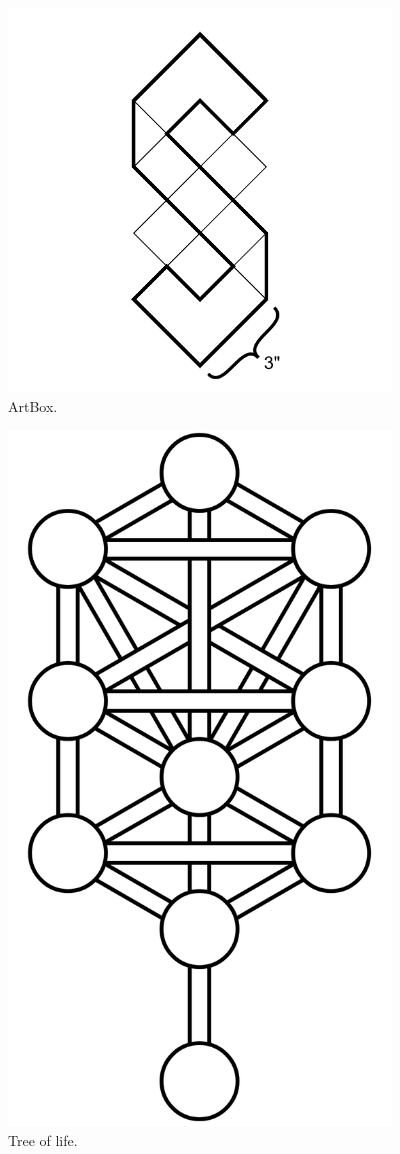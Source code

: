 \begin{figure}
	\centering
	\includegraphics[width=4in]{imageserver/uploadimages/image10.png}
	\caption{ArtBox.}
\end{figure}

\begin{figure}
	\centering
	\includegraphics[width=4in]{imageserver/uploadimages/image1.png}
	\caption{Tree of life.}
\end{figure}

